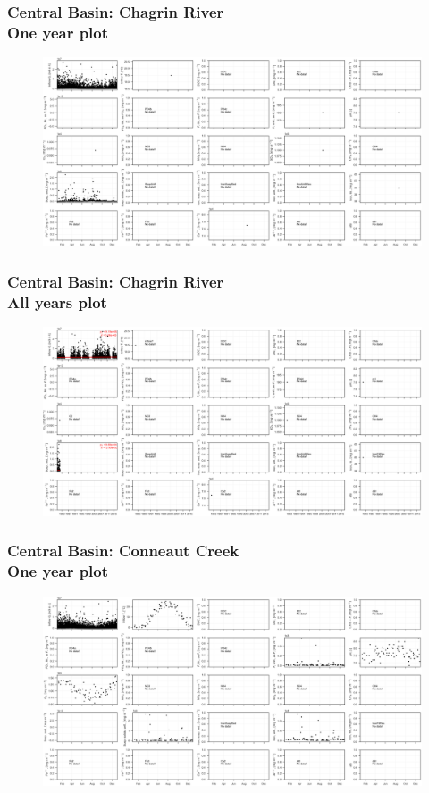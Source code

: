 \documentclass{beamer}
\begin{document}
\begin{frame}
\frametitle{Central Basin: Chagrin River\\ One year plot}
\begin{figure}
\includegraphics[width=\textwidth]{rivers/Central basin/plot_1yr chagrinriver.png}
\end{figure}
\end{frame}

\begin{frame}
\frametitle{Central Basin: Chagrin River\\ All years plot}
\begin{figure}
\includegraphics[width=\textwidth]{rivers/Central basin/plot_all chagrinriver.png}
\end{figure}
\end{frame}

\begin{frame}
\frametitle{Central Basin: Conneaut Creek\\ One year plot}
\begin{figure}
\includegraphics[width=\textwidth]{rivers/Central basin/plot_1yr conneautcreek.png}
\end{figure}
\end{frame}
\end{document}
